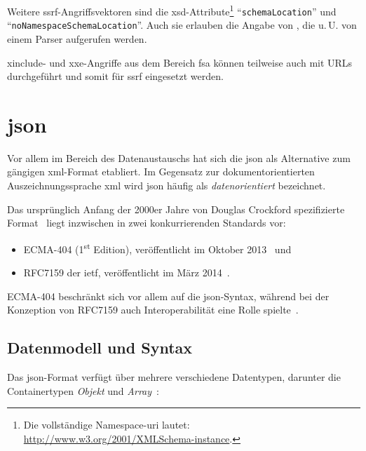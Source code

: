 Weitere \acrshort{ssrf}-Angriffsvektoren sind die \acrshort{xsd}-Attribute\footnote{Die vollständige Namespace-\acrshort{uri} lautet: \url{http://www.w3.org/2001/XMLSchema-instance}.} \enquote{\texttt{schemaLocation}} und \linebreak{}\enquote{\texttt{noNamespaceSchemaLocation}}. Auch sie erlauben die Angabe von , die u.\,U. von einem Parser aufgerufen werden.\cite[S.~8f]{morgan2014xml}

\acrshort{xinclude}- und \acrshort{xxe}-Angriffe aus dem Bereich \acrlong{fsa} können teilweise auch mit URLs durchgeführt und somit für \acrlong{ssrf} eingesetzt werden.

\section{\acrfull{json}}
\label{sec:json}

Vor allem im Bereich des Datenaustauschs hat sich die \acrfull{json} als Alternative zum gängigen \acrshort{xml}-Format etabliert. Im Gegensatz zur dokumentorientierten Auszeichnungssprache \acrshort{xml} wird \acrshort{json} häufig als \emph{datenorientiert} bezeichnet.~\cite{gupta2007xmljson}

Das ursprünglich Anfang der 2000er Jahre von Douglas Crockford spezifizierte Format~\cite{crockford2009jsonsaga} liegt inzwischen in zwei konkurrierenden Standards vor:
\begin{itemize}
    \item{} ECMA-404 (1\textsuperscript{st} Edition), veröffentlicht im Oktober 2013~\cite{ecma404} und
    \item{} RFC7159 der \acrfull{ietf}, veröffentlicht im März 2014~\cite{rfc7159}.
\end{itemize}

ECMA-404 beschränkt sich vor allem auf die \acrshort{json}-Syntax, während bei der Konzeption von RFC7159 auch Interoperabilität eine Rolle spielte~\cite{bray2014jsonredux}.

\subsection{Datenmodell und Syntax}
\label{sec:jsontypes}

Das \acrshort{json}-Format verfügt über mehrere verschiedene Datentypen, darunter die Containertypen \emph{Objekt} und \emph{Array}~\cite{ecma404}:

